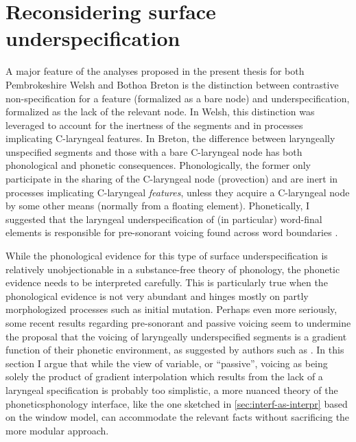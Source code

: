 \section{Reconsidering surface underspecification}
\label{sec:recons-surf-undersp}

A major feature of the analyses proposed in the present thesis for both Pembrokeshire Welsh and Bothoa Breton is the distinction between contrastive non\hyp specification for a feature (formalized as a bare node) and underspecification, formalized as the lack of the relevant node. In Welsh, this distinction was leveraged to account for the inertness of the  segments \ipa{[v]} and \ipa{[ð]} in processes implicating C-laryngeal features. In Breton, the difference between laryngeally unspecified segments and those with a bare C\hyp laryngeal node has both phonological and phonetic consequences. Phonologically, the former only participate in the sharing of the C-laryngeal node (\ie provection) and are inert in processes implicating C-laryngeal \emph{features}, unless they acquire a C-laryngeal node by some other means (normally from a floating element). Phonetically, I suggested that the laryngeal underspecification of (in particular) word-final elements is responsible for pre\hyp sonorant voicing found across word boundaries \citep[\cfm][]{colina09:_sibil_ecuad_spanis}.

While the phonological evidence for this type of surface underspecification is relatively unobjectionable in a substance\hyp free theory of phonology, the phonetic evidence needs to be interpreted carefully. This is particularly true when the phonological evidence is not very abundant and hinges mostly on partly morphologized processes such as initial mutation. Perhaps even more seriously, some recent results regarding pre-sonorant and passive voicing \citep{strycharczuk11:_explain,strycharczuk11:_phonet,strycharczuk12:_phonet} seem to undermine the proposal that the voicing of laryngeally underspecified segments is a gradient function of their phonetic environment, as suggested by authors such as \citet{keating88:_under,keating90:_phonet,keating96,hsu98:_voicin_taiwan,colina09:_sibil_ecuad_spanis}. In this section I argue that while the view of variable, or \enquote{passive}, voicing as being solely the product of gradient interpolation which results from the lack of a laryngeal specification is probably too simplistic, a more nuanced theory of the phonetics\endash phonology interface, like the one sketched in \cref{sec:interf-as-interpr} based on the window model, can accommodate the relevant facts without sacrificing the more modular approach.

